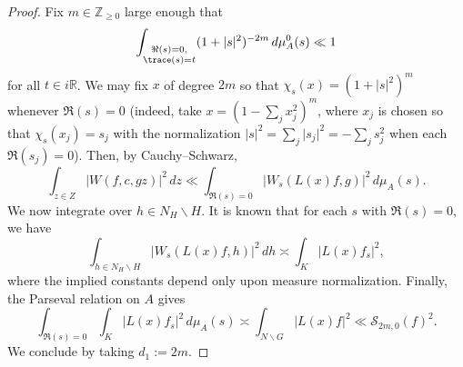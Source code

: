 \begin{proof}
  Fix $m \in \mathbb{Z}_{\geq 0}$ large enough that
  \begin{equation*}
    \int_{
      \substack{
        \Re(s) = 0,  \\
        \trace(s) = t
      }
    }
    (1 + |s|^2)^{-2 m} \, d \mu_A^0(s) \ll 1
  \end{equation*}
  for all $t \in i \mathbb{R}$.  We may fix $x$ of degree $2 m$ so that $\chi_s(x) = (1 + |s|^2)^m$ whenever $\Re(s) = 0$ (indeed, take $x = (1 - \sum_{j} x_j^2)^{m}$, where $x_j$ is chosen so that $\chi_s(x_j) = s_j$ with the normalization $\lvert s \rvert^2 = \sum_j \lvert s_j \rvert^2 = -\sum_j s_j^2$ when each $\Re(s_j) = 0$).  Then, by Cauchy--Schwarz,
  \begin{equation*}
    \int_{z \in Z}
    |W(f,c,g z)|^2 \, d z \ll
    \int_{\Re(s) = 0}
    \left\lvert W_s(L(x) f, g)  \right\rvert^2 \, d \mu_A(s).
  \end{equation*}
  We now integrate over $h \in N_H \backslash H$.  It is known \cite[Appendix A]{MR2930996} that for each $s$ with $\Re(s) = 0$, we have
  \begin{equation}\label{eq:int-_g-in-norm}
    \int_{h \in N_H \backslash H} |W_s(L(x) f, h)|^2 \, d h
    \asymp
    \int_{K} |L(x) f_s|^2,
  \end{equation}
  where the implied constants depend only upon measure normalization.  Finally, the Parseval relation on $A$ gives
  \begin{equation*}
    \int_{\Re(s) = 0} \int_K |L(x) f_s|^2 \, d \mu_A(s) \asymp \int_{N \backslash G} |L(x) f|^2
    \ll \mathcal{S}_{2 m,0}(f)^2.
  \end{equation*}
  We conclude by taking $d_1 := 2 m$.
\end{proof}



